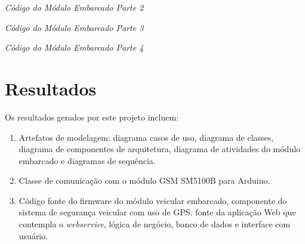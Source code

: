 \renewcommand{\baselinestretch}{0.5}  %
\begin{codigo}[htb]
\fontsize{9pt}{9pt}\selectfont
      \begin{boxit}  %
      \vspace{2mm}
   \end{boxit}
   \caption{\it Código do Módulo Embarcado Parte 2}
   \label{code:embedded2}
\end{codigo}

\renewcommand{\baselinestretch}{0.5}  %
\begin{codigo}[htb]
\fontsize{9pt}{9pt}\selectfont
      \begin{boxit}  %
      \vspace{2mm}
   \end{boxit}
   \caption{\it Código do Módulo Embarcado Parte 3}
   \label{code:embedded3}
\end{codigo}

\renewcommand{\baselinestretch}{0.5}  %
\begin{codigo}[htb]
\fontsize{9pt}{9pt}\selectfont
      \begin{boxit}  %
      \vspace{2mm}
   \end{boxit}
   \caption{\it Código do Módulo Embarcado Parte 4}
   \label{code:embedded4}
\end{codigo}

\section{Resultados}

Os resultados gerados por este projeto incluem:

\begin{enumerate}
	\item Artefatos de modelagem: diagrama casos de uso, diagrama de classes, diagrama de componentes de arquitetura, diagrama de atividades do módulo embarcado e diagramas de sequência.
	\item Classe de comunicação com o módulo GSM SM5100B para Arduino.
	\item Código fonte do firmware do módulo veicular embarcado, componente do sistema de segurança veicular com uso de GPS.
	 fonte da aplicação Web que contempla o \textit{webservice}, lógica de negócio, banco de dados e interface com usuário. 
\end{enumerate}

